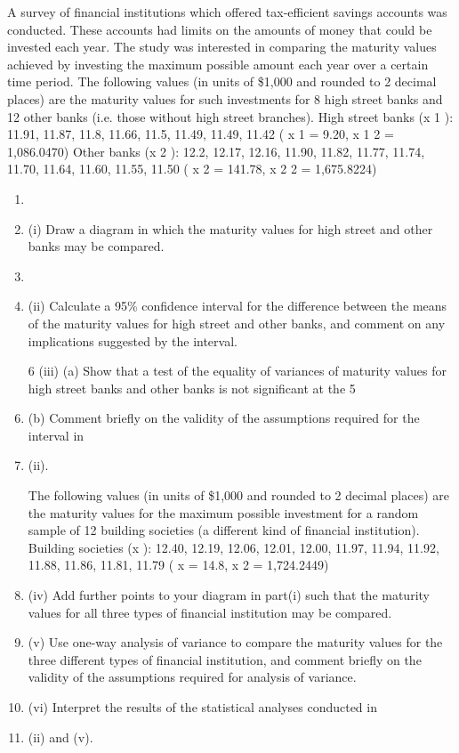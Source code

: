 \documentclass[a4paper,12pt]{article}
\begin{document}
\begin{enumerate}

A survey of financial institutions which offered tax-efficient savings accounts was conducted. These accounts had limits on the amounts of money that could be invested each year. The study was interested in comparing the maturity values achieved by investing the maximum possible amount each year over a certain time period.
The following values (in units of \$1,000 and rounded to 2 decimal places) are the
maturity values for such investments for 8 high street banks and 12 other banks (i.e.
those without high street branches).
High street banks (x 1 ): 11.91, 11.87, 11.8, 11.66, 11.5, 11.49, 11.49, 11.42
( x 1 = 9.20, x 1 2 = 1,086.0470)
Other banks (x 2 ): 12.2, 12.17, 12.16, 11.90, 11.82, 11.77, 11.74, 11.70, 11.64, 11.60,
11.55, 11.50
( x 2 = 141.78, x 2 2 = 1,675.8224)
\begin{enumerate}[\item (i)]
\item \item (i) Draw a diagram in which the maturity values for high street and other banks
may be compared.
\item 
\item (ii) Calculate a 95\% confidence interval for the difference between the means of the maturity values for high street and other banks, and comment on any
implications suggested by the interval.
\item [6]
(iii) (a)
Show that a test of the equality of variances of maturity values for high street banks and other banks is not significant at the 5%
\item (b)
Comment briefly on the validity of the assumptions required for the interval in \item (ii).

The following values (in units of \$1,000 and rounded to 2 decimal places) are the
maturity values for the maximum possible investment for a random sample of 12
building societies (a different kind of financial institution).
Building societies (x  ): 12.40, 12.19, 12.06, 12.01, 12.00, 11.97, 11.94, 11.92, 11.88,
11.86, 11.81, 11.79
( x  = 14.8, x  2 = 1,724.2449)
\item (iv) Add further points to your diagram in part(i) such that the maturity values for
all three types of financial institution may be compared.
\item (v) Use one-way analysis of variance to compare the maturity values for the three different types of financial institution, and comment briefly on the validity of
the assumptions required for analysis of variance.
\item (vi) Interpret the results of the statistical analyses conducted in \item (ii) and (v).
\end{enumerate}


\end{enumerate}
\end{document}
